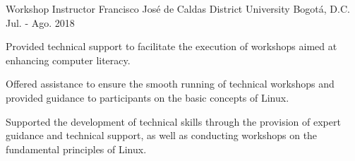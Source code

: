 \begin{cventries}

\cventry
{Workshop Instructor} %
{Francisco José de Caldas District University} %
{Bogotá, D.C.} %
{Jul. - Ago. 2018} %
{ %
\begin{cvitems}
\item {Provided technical support to facilitate the execution of workshops aimed at enhancing computer literacy.}
\item {Offered assistance to ensure the smooth running of technical workshops and provided guidance to participants on the basic concepts of Linux.}
\item {Supported the development of technical skills through the provision of expert guidance and technical support, as well as conducting workshops on the fundamental principles of Linux.}
\end{cvitems}
}


\end{cventries}